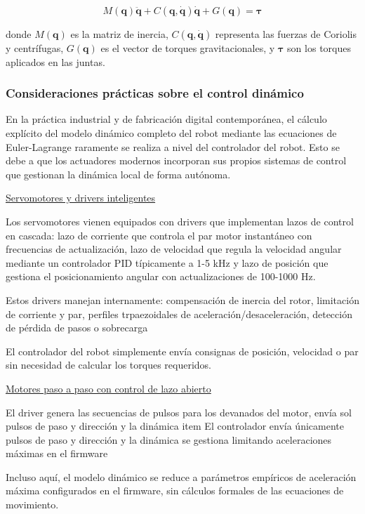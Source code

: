 \begin{equation}
M(\mathbf{q})\ddot{\mathbf{q}} + C(\mathbf{q}, \dot{\mathbf{q}})\dot{\mathbf{q}} + G(\mathbf{q}) = \boldsymbol{\tau}
\end{equation}

donde $M(\mathbf{q})$ es la matriz de inercia, $C(\mathbf{q}, \dot{\mathbf{q}})$ representa las fuerzas de Coriolis y centrífugas, $G(\mathbf{q})$ es el vector de torques gravitacionales, y $\boldsymbol{\tau}$ son los torques aplicados en las juntas.

\subsubsection{Consideraciones prácticas sobre el control dinámico}

En la práctica industrial y de fabricación digital contemporánea, el cálculo explícito del modelo dinámico completo del robot mediante las ecuaciones de Euler-Lagrange raramente se realiza a nivel del controlador del robot. Esto se debe a que los actuadores modernos incorporan sus propios sistemas de control que gestionan la dinámica local de forma autónoma.

\underline{Servomotores y drivers inteligentes}

Los servomotores vienen equipados con drivers que implementan lazos de control en cascada: lazo de corriente que controla el par motor instantáneo con frecuencias de actualización, lazo de velocidad que regula la velocidad angular mediante un controlador PID típicamente a 1-5 kHz y lazo de posición que gestiona el posicionamiento angular con actualizaciones de 100-1000 Hz.

Estos drivers manejan internamente: compensación de inercia del rotor, limitación de corriente y par, perfiles trpaezoidales de aceleración/desaceleración, detección de pérdida de pasos o sobrecarga

El controlador del robot simplemente envía consignas de posición, velocidad o par sin necesidad de calcular los torques requeridos.

\underline{Motores paso a paso con control de lazo abierto}

El driver genera las secuencias de pulsos para los devanados del motor, envía sol pulsos de paso y dirección y la dinámica item El controlador envía únicamente pulsos de paso y dirección y la dinámica se gestiona limitando aceleraciones máximas en el firmware

Incluso aquí, el modelo dinámico se reduce a parámetros empíricos de aceleración máxima configurados en el firmware, sin cálculos formales de las ecuaciones de movimiento.

